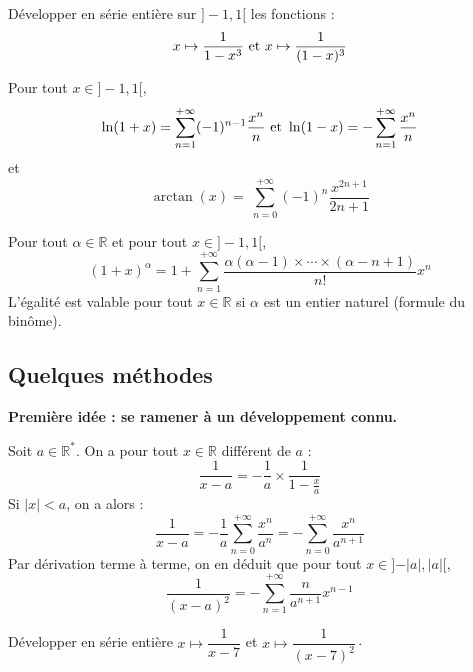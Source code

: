 \documentclass[a4paper,10pt]{report}
\begin{document}
\begin{exa} Développer en série entière sur $]-1,1[$ les fonctions :
$$ x \mapsto \dfrac{1}{1-x^3} \hbox{ et } x \mapsto \dfrac{1}{(1-x)^3}$$
\end{exa}

\begin{prop} Pour tout $x \in ]-1,1[$,
$$ \ln(1+x) = \sum_{n=1}^{+ \infty} (-1)^{n-1} \dfrac{x^n}{n} \hbox{ et } \ln(1-x) = -\sum_{n=1}^{+ \infty} \dfrac{x^n}{n}$$
et 
$$ \arctan(x)= \ \sum_{n=0}^{+ \infty} (-1)^n \frac{x^{2n+1}}{2n+1} $$
\end{prop}

\begin{preuve}
\vspace{7.5cm}
\end{preuve}

\begin{thm} Pour tout $\alpha \in \mathbb{R}$ et pour tout $x \in ]-1,1[$,
$$ (1+x)^{\alpha} = 1 + \sum_{n=1}^{+ \infty} \dfrac{\alpha (\alpha-1) \times \cdots \times (\alpha-n+1)}{n!} x^n$$
L'égalité est valable pour tout $x \in \mathbb{R}$ si $\alpha$ est un entier naturel (formule du binôme).
\end{thm}

\begin{preuve}

\vspace{12cm}
\end{preuve}

%
%

\newpage
\subsection{Quelques méthodes}
\noindent \textbf{Première idée : se ramener à un développement connu.}

\noindent Soit $a \in \mathbb{R}^{*}$. On a pour tout $x \in \mathbb{R}$ différent de $a$ :
$$ \dfrac{1}{x-a} = - \dfrac{1}{a} \times \dfrac{1}{1- \frac{x}{a}}$$
Si $\vert x \vert <a$, on a alors :
$$ \dfrac{1}{x-a} = - \dfrac{1}{a} \sum_{n=0}^{+ \infty} \dfrac{x^n}{a^n} = -\sum_{n=0}^{+ \infty} \dfrac{x^n}{a^{n+1}}$$
Par dérivation terme à terme, on en déduit que pour tout $x \in ]-\vert a \vert, \vert a \vert[$,
$$ \dfrac{1}{(x-a)^2} = - \sum_{n=1}^{+ \infty} \dfrac{n}{a^{n+1}} x^{n-1}$$

\begin{exa} Développer en série entière $x \mapsto \dfrac{1}{x-7}$ et $x \mapsto \dfrac{1}{(x-7)^2}\cdot$
\end{exa}
\end{document}
